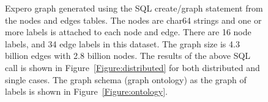 \documentclass[preprint,3p,twocolumn]{elsarticle}
\begin{document}
\begin{figure}
\centering
    \caption{Expero graph generated using the SQL create/graph statement from the nodes and edges tables. The nodes are char64 strings and one or more labels is attached to each node and edge. There are 16 node labels, and 34 edge labels in this dataset. The graph size is 4.3 billion edges with 2.8 billion nodes. The results of the above SQL call is shown in Figure~\ref{Figure:distributed} for both distributed and single cases. The graph schema (graph ontology) as the graph of labels is shown in Figure~\ref{Figure:ontology}.}
    \label{Figure:creategraph}
\end{figure}
\end{document}
